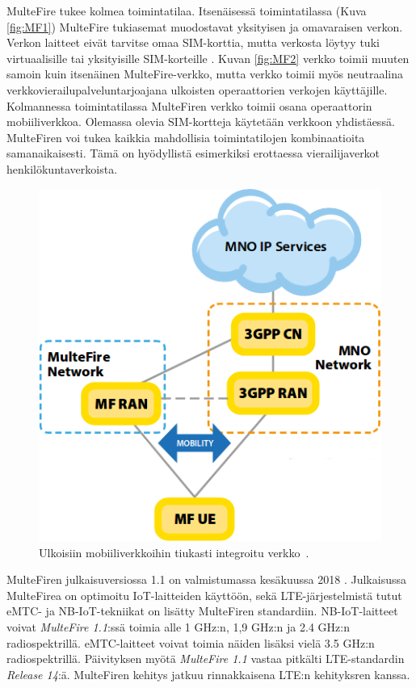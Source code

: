\documentclass[finnish,12pt,a4paper,pdftex]{article}
\begin{document}
MulteFire tukee kolmea toimintatilaa. Itsenäisessä toimintatilassa (Kuva \ref{fig:MF1}) MulteFire tukiasemat muodostavat yksityisen ja omavaraisen verkon. Verkon laitteet eivät tarvitse omaa SIM-korttia, mutta verkosta löytyy tuki virtuaalisille tai yksityisille SIM-korteille \cite{chambers2016multefire}. Kuvan \ref{fig:MF2} verkko toimii muuten samoin kuin itsenäinen MulteFire-verkko, mutta verkko toimii myös neutraalina verkkovierailupalveluntarjoajana ulkoisten operaattorien verkojen käyttäjille. Kolmannessa toimintatilassa MulteFiren verkko toimii osana operaattorin mobiiliverkkoa. Olemassa olevia SIM-kortteja käytetään verkkoon yhdistäessä. MulteFiren voi tukea kaikkia mahdollisia toimintatilojen kombinaatioita samanaikaisesti. Tämä on hyödyllistä esimerkiksi erottaessa vierailijaverkot henkilökuntaverkoista.
~\begin{figure}[h!]
    \centering
    \includegraphics[scale=0.25]{Images/MF3.png}
    \caption{Ulkoisiin mobiiliverkkoihin tiukasti integroitu verkko~\cite{chambers2016multefire}.}
    \label{fig:MF3}
\end{figure}

MulteFiren julkaisuversiossa 1.1 on valmistumassa kesäkuussa 2018 \cite{multefire11}. Julkaisussa MulteFirea on optimoitu IoT-laitteiden käyttöön, sekä LTE-järjestelmistä tutut eMTC- ja NB-IoT-tekniikat on lisätty MulteFiren standardiin. NB-IoT-laitteet voivat \textit{MulteFire 1.1}:ssä toimia alle 1 GHz:n, 1,9 GHz:n ja 2.4 GHz:n radiospektrillä. eMTC-laitteet voivat toimia näiden lisäksi vielä 3.5 GHz:n radiospektrillä. Päivityksen myötä \textit{MulteFire 1.1} vastaa pitkälti LTE-standardin \textit{Release 14}:ä. MulteFiren kehitys jatkuu rinnakkaisena LTE:n kehityksren kanssa.
\end{document}
